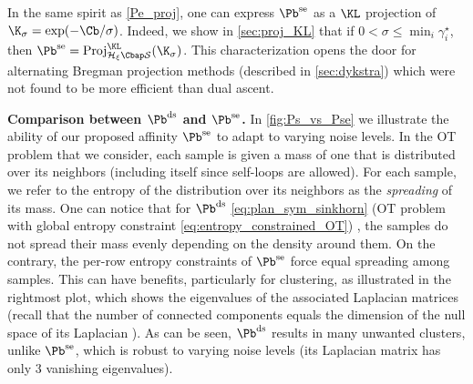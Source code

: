 \begin{remark}
  In the same spirit as \cref{Pe_proj}, one can express $\Pb^{\mathrm{se}}$ as a $\KL$ projection of $\K_{\sigma} = \exp(-\Cb/\sigma)$.
  Indeed, we show in \cref{sec:proj_KL} that if $0 < \sigma \leq \min_i \gamma^\star_i$, then $\Pb^{\mathrm{se}} = \operatorname{Proj}^{\operatorname{\KL}}_{\mathcal{H}_{\xi} \Cbap
  \mathcal{S}}(\K_{\sigma})$. This characterization opens the door for alternating Bregman projection methods (described in \cref{sec:dykstra}) which were not found to be more efficient than dual ascent.
\end{remark}

\textbf{Comparison between $\Pb^{\mathrm{ds}}$ and $\Pb^{\mathrm{se}}$.} In \cref{fig:Ps_vs_Pse} we illustrate the ability of our proposed affinity $\Pb^{\mathrm{se}}$ to adapt to varying noise levels. In the OT problem that we consider, each sample is given a mass of one that is distributed over its neighbors (including itself since self-loops are allowed). For each sample, we refer to the entropy of the distribution over its neighbors as the \emph{spreading} of its mass. One can notice that for $\Pb^{\mathrm{ds}}$ \eqref{eq:plan_sym_sinkhorn} 
(OT problem with global entropy constraint \eqref{eq:entropy_constrained_OT})
, the samples do not spread their mass evenly depending on the density around them. On the contrary, the per-row entropy constraints of $\Pb^{\mathrm{se}}$ force equal spreading among samples.
This can have benefits, particularly for clustering, as illustrated in the rightmost plot, which shows the eigenvalues of the associated Laplacian matrices (recall that the number of connected components equals the dimension of the null space of its Laplacian \cite{chung1997spectral}). As can be seen, $\Pb^{\mathrm{ds}}$ results in many unwanted clusters, unlike $\Pb^{\mathrm{se}}$, which is robust to varying noise levels (its Laplacian matrix has only $3$ vanishing eigenvalues). 

